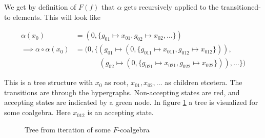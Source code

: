 \documentclass[12pt]{article}
\newcommand{\1}{\mathbbm{1}}
\begin{document}
We get by definition of $F(f)$ that $\alpha$ gets recursively applied to the transitioned-to elements. This will look like

\begin{align*}
    \alpha(x_0) &= (0, \{g_{01}\mapsto x_{01}, g_{02}\mapsto x_{02}, \dots\})\\
    \implies \alpha\circ\alpha(x_0) &= (0, \{(g_{01}\mapsto (0, \{g_{011}\mapsto x_{011}, g_{012}\mapsto x_{012}\})),\\
    &\hspace{40pt}(g_{02}\mapsto (0, \{g_{021}\mapsto x_{021}, g_{022}\mapsto x_{022}\})), \dots\})
\end{align*}

This is a tree structure with $x_0$ as root, $x_{01}, x_{02}, \dots$ as children etcetera. The transitions are through the hypergraphs. Non-accepting states are red, and accepting states are indicated by a green node. In figure \ref{ex:coalg-tree} a tree is visualized for some coalgebra. Here $x_{012}$ is an accepting state.

\begin{figure}[h]
    \centering
    \caption{Tree from iteration of some $F$-coalgebra}
    \label{ex:coalg-tree}
\end{figure}
\end{document}
